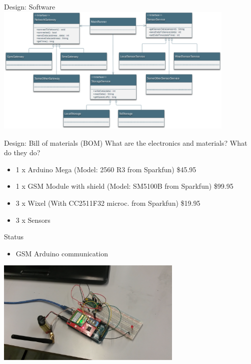 \documentclass{beamer}
\begin{document}
\begin{frame}{Design: Software}
\centering
\includegraphics[width=11.5cm]{graphics/ClassDiagram.png}
\end{frame}

\begin{frame}{Design: Bill of materials (BOM)}
What are the electronics and materials?  What do they do? 

\begin{itemize}
\item 1 x Arduino Mega (Model: 2560 R3 from Sparkfun) \$45.95
\item 1 x GSM Module with shield  (Model: SM5100B from Sparkfun) \$99.95
\item 3 x Wixel   (With CC2511F32 microc. from Sparkfun) \$19.95
\item 3 x Sensors
\end{itemize}
\end{frame}

\begin{frame}{Status}
\begin{itemize}
\item GSM Arduino communication
\end{itemize}
\centering
\includegraphics[height=5cm]{graphics/gsmArduino.jpg}
\end{frame}
\end{document}
